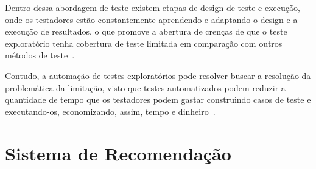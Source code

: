 Dentro dessa abordagem de teste existem etapas de design de teste e execução, onde os testadores estão constantemente aprendendo e 
adaptando o design e a execução de resultados, o que promove a abertura de crenças de que o teste exploratório tenha cobertura de 
teste limitada em comparação com outros métodos de teste~\cite{schaefer2014model}.

Contudo, a automação de testes exploratórios pode resolver buscar a resolução da problemática da limitação, visto que testes 
automatizados podem reduzir a quantidade de tempo que os testadores podem gastar construindo casos de teste e executando-os, 
economizando, assim, tempo e dinheiro~\cite{dustin2009implementing}. 


\section{Sistema de Recomendação}
